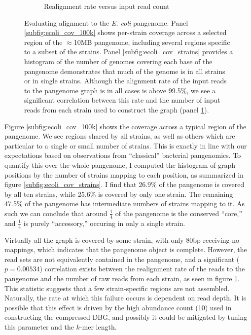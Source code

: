 \begin{figure}[htbp!]
\begin{subfigure}[t]{0.49\textwidth}
    \caption{Realignment rate versus input read count}
    \label{subfig:ecoli_realignment_vs_input}
  \end{subfigure}
  \caption[Evaluating alignment to the \emph{E. coli} pangenome.]{
    Evaluating alignment to the \emph{E. coli} pangenome.
    Panel \ref{subfig:ecoli_cov_100k} shows per-strain coverage across a selected region of the $\approx$10MB pangenome, including several regions specific to a subset of the strains.
    Panel \ref{subfig:ecoli_cov_strains} provides a histogram of the number of genomes covering each base of the pangenome demonstrates that much of the genome is in all strains or in single strains.
    Although the alignment rate of the input reads to the pangenome graph is in all cases is above 99.5\%, we see a significant correlation between this rate and the number of input reads from each strain used to construct the graph (panel \ref{subfig:ecoli_realignment_vs_input}).
  }
  \label{fig:ecoli_pangenome_alignment}
\end{figure}

Figure \ref{subfig:ecoli_cov_100k} shows the coverage across a typical region of the pangenome.
We see regions shared by all strains, as well as others which are particular to a single or small number of strains.
This is exactly in line with our expectations based on observations from ``classical'' bacterial pangenomics.
To quantify this over the whole pangenome, I computed the histogram of graph positions by the number of strains mapping to each position, as summarized in figure \ref{subfig:ecoli_cov_strains}.
I find that 26.9\% of the pangenome is covered by all ten strains, while 25.6\% is covered by only one strain.
The remaining 47.5\% of the pangenome has intermediate numbers of strains mapping to it.
As such we can conclude that around $\frac{1}{4}$ of the pangenome is the conserved ``core,'' and $\frac{1}{4}$ is purely ``accessory,'' occuring in only a single strain.

Virtually all the graph is covered by some strain, with only 80bp receiving no mappings, which indicates that the pangenome object is complete.
However, the read sets are not equivalently contained in the pangenome, and a significant ($p=0.00534$) correlation exists between the realignment rate of the reads to the pangenome and the number of raw reads from each strain, as seen in figure \ref{subfig:ecoli_realignment_vs_input}.
This statistic suggests that a few strain-specific regions are not assembled.
Naturally, the rate at which this failure occurs is dependent on read depth.
It is possible that this effect is driven by the high abundance count (10) used in constructing the compressed DBG, and possibly it could be mitigated by tuning this parameter and the $k$-mer length.

